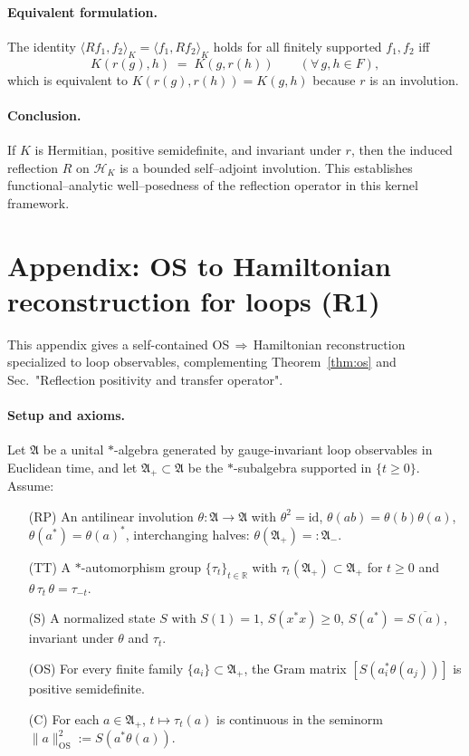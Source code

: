 \documentclass[11pt]{amsart}
\begin{document}
\paragraph{Equivalent formulation.}
The identity $\langle Rf_1,f_2\rangle_K=\langle f_1,Rf_2\rangle_K$ holds for all finitely supported $f_1,f_2$ iff
\[
  K(r(g),h)\;=\;K(g,r(h))\qquad (\forall\,g,h\in F),
\]
which is equivalent to $K(r(g),r(h))=K(g,h)$ because $r$ is an involution.

\paragraph{Conclusion.}
If $K$ is Hermitian, positive semidefinite, and invariant under $r$, then the induced reflection $R$ on $\mathcal{H}_K$ is a bounded self--adjoint involution. This establishes functional--analytic well--posedness of the reflection operator in this kernel framework.

\section{Appendix: OS to Hamiltonian reconstruction for loops (R1)}

This appendix gives a self-contained OS\,$\Rightarrow$\,Hamiltonian reconstruction specialized to loop observables, complementing Theorem~\ref{thm:os} and Sec.~"Reflection positivity and transfer operator".

\paragraph{Setup and axioms.}
Let $\mathfrak A$ be a unital $*$-algebra generated by gauge-invariant loop observables in Euclidean time, and let $\mathfrak A_+\subset\mathfrak A$ be the $*$-subalgebra supported in $\{t\ge 0\}$. Assume:
\begin{itemize}
\item[(RP)] An antilinear involution $\theta:\mathfrak A\to\mathfrak A$ with $\theta^2=\mathrm{id}$, $\theta(ab)=\theta(b)\theta(a)$, $\theta(a^*)=\theta(a)^*$, interchanging halves: $\theta(\mathfrak A_+)=:\mathfrak A_-.$
\item[(TT)] A $*$-automorphism group $\{\tau_t\}_{t\in\mathbb R}$ with $\tau_t(\mathfrak A_+)\subset\mathfrak A_+$ for $t\ge 0$ and $\theta\,\tau_t\,\theta=\tau_{-t}$.
\item[(S)] A normalized state $S$ with $S(1)=1$, $S(x^*x)\ge 0$, $S(a^*)=\overline{S(a)}$, invariant under $\theta$ and $\tau_t$.
\item[(OS)] For every finite family $\{a_i\}\subset\mathfrak A_+$, the Gram matrix $[S(a_i^*\theta(a_j))]$ is positive semidefinite.
\item[(C)] For each $a\in\mathfrak A_+$, $t\mapsto\tau_t(a)$ is continuous in the seminorm $\|a\|_{\mathrm{OS}}^2:=S(a^*\theta(a))$.
\end{itemize}
\end{document}
